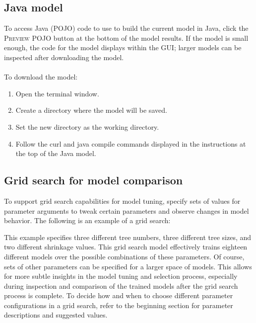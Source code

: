 \subsection{Java model}

To access Java (POJO) code to use to build the current model in Java, click the \textsc{Preview POJO} button at the
bottom of the model results. If the model is small enough, the code for the model displays within the GUI; larger
models can be inspected after downloading the model.
\\
\\
To download the model:
\begin{enumerate}
\item Open the terminal window.
\item Create a directory where the model will be saved.
\item Set the new directory as the working directory.
\item Follow the curl and java compile commands displayed in the instructions at the top of the Java model.
\end{enumerate}


\subsection{Grid search for model comparison}

To support grid search capabilities for model tuning,  specify sets of values for parameter arguments to tweak
certain parameters and observe changes in model behavior. The following is an example of a grid search:

\waterExampleInR


\waterExampleInPython


This example specifies three different tree numbers, three different tree sizes, and two different shrinkage values.
This grid search model effectively trains eighteen different models over the possible combinations of these parameters.
Of course, sets of other parameters can be specified for a larger space of models. This allows for more subtle
insights in the model tuning and selection process, especially during inspection and comparison of the trained
models after the grid search process is complete. To decide how and when to choose different parameter configurations
in a grid search, refer to the beginning section for parameter descriptions and suggested values.

